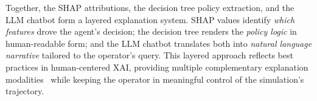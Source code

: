 Together, the SHAP attributions, the decision tree policy extraction, and the LLM chatbot form a layered explanation system. SHAP values identify \emph{which features} drove the agent's decision; the decision tree renders the \emph{policy logic} in human-readable form; and the LLM chatbot translates both into \emph{natural language narrative} tailored to the operator's query. This layered approach reflects best practices in human-centered XAI, providing multiple complementary explanation modalities~\cite{ye2023complementary} while keeping the operator in meaningful control of the simulation's trajectory.

